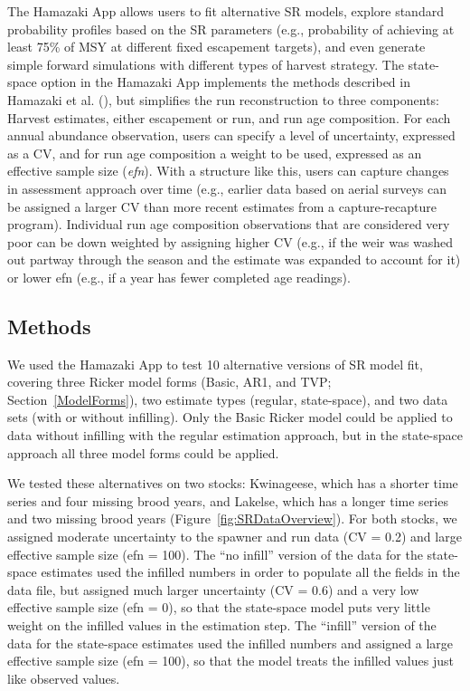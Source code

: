 \documentclass[french,11pt]{book}
\begin{document}
The Hamazaki App allows users to fit alternative SR models, explore standard probability profiles based on the SR parameters (e.g., probability of achieving at least 75\% of MSY at different fixed escapement targets), and even generate simple forward simulations with different types of harvest strategy. The state-space option in the Hamazaki App implements the methods described in Hamazaki et al. (), but simplifies the run reconstruction to three components: Harvest estimates, either escapement or run, and run age composition. For each annual abundance observation, users can specify a level of uncertainty, expressed as a CV, and for run age composition a weight to be used, expressed as an effective sample size (\emph{efn}). With a structure like this, users can capture changes in assessment approach over time (e.g., earlier data based on aerial surveys can be assigned a larger CV than more recent estimates from a capture-recapture program). Individual run age composition observations that are considered very poor can be down weighted by assigning higher CV (e.g., if the weir was washed out partway through the season and the estimate was expanded to account for it) or lower efn (e.g., if a year has fewer completed age readings).

\subsection{Methods}\label{methods-1}

We used the Hamazaki App to test 10 alternative versions of SR model fit, covering three Ricker model forms (Basic, AR1, and TVP; Section~\ref{ModelForms}), two estimate types (regular, state-space), and two data sets (with or without infilling). Only the Basic Ricker model could be applied to data without infilling with the regular estimation approach, but in the state-space approach all three model forms could be applied.

We tested these alternatives on two stocks: Kwinageese, which has a shorter time series and four missing brood years, and Lakelse, which has a longer time series and two missing brood years (Figure~\ref{fig:SRDataOverview}). For both stocks, we assigned moderate uncertainty to the spawner and run data (CV = 0.2) and large effective sample size (efn = 100). The ``no infill'' version of the data for the state-space estimates used the infilled numbers in order to populate all the fields in the data file, but assigned much larger uncertainty (CV = 0.6) and a very low effective sample size (efn = 0), so that the state-space model puts very little weight on the infilled values in the estimation step. The ``infill'' version of the data for the state-space estimates used the infilled numbers and assigned a large effective sample size (efn = 100), so that the model treats the infilled values just like observed values.
\end{document}
